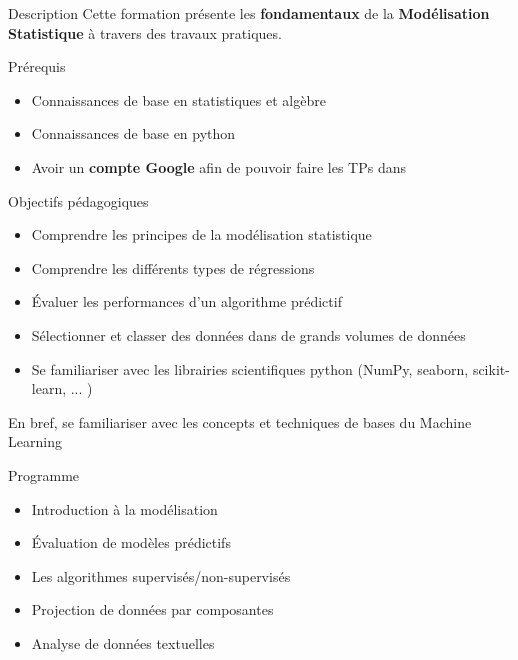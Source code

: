 \begin{frame}{Description}
  Cette formation présente les \textbf{fondamentaux} de la \textbf{Modélisation Statistique} à travers des travaux pratiques.
\end{frame}

\begin{frame}{Prérequis}
  \begin{itemize}
  \item Connaissances de base en statistiques et algèbre
  \item Connaissances de base en python
  \item Avoir un \textbf{compte Google} afin de pouvoir faire les TPs dans 
  \end{itemize}
\end{frame}

\begin{frame}{Objectifs pédagogiques}
  \begin{itemize}
  \item Comprendre les principes de la modélisation statistique
  \item Comprendre les différents types de régressions
  \item Évaluer les performances d'un algorithme prédictif
  \item Sélectionner et classer des données dans de grands volumes de données
  \item Se familiariser avec les librairies scientifiques python (NumPy, seaborn, scikit-learn, ... )
  \end{itemize}
  En bref, se familiariser avec les concepts et techniques de bases du \og{}Machine Learning\fg
\end{frame}

\begin{frame}{Programme}
  \begin{itemize}
  \item Introduction à la modélisation
  \item Évaluation de modèles prédictifs
  \item Les algorithmes supervisés/non-supervisés
  \item Projection de données par composantes
  \item Analyse de données textuelles
  \end{itemize}
\end{frame}
